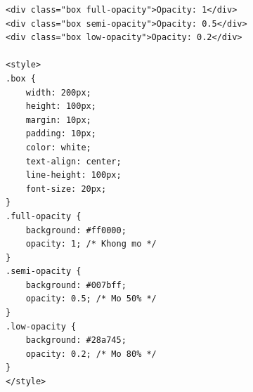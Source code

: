 \begin{codeWindow}
\begin{lstlisting}[language=HTML5]
<div class="box full-opacity">Opacity: 1</div>
<div class="box semi-opacity">Opacity: 0.5</div>
<div class="box low-opacity">Opacity: 0.2</div>

<style>
.box {
    width: 200px;
    height: 100px;
    margin: 10px;
    padding: 10px;
    color: white;
    text-align: center;
    line-height: 100px;
    font-size: 20px;
}
.full-opacity {
    background: #ff0000;
    opacity: 1; /* Khong mo */
}
.semi-opacity {
    background: #007bff;
    opacity: 0.5; /* Mo 50% */
}
.low-opacity {
    background: #28a745;
    opacity: 0.2; /* Mo 80% */
}
</style>
\end{lstlisting}
\end{codeWindow}

